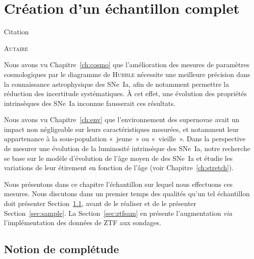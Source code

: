 \documentclass[../main/main.tex]{subfiles}
\begin{document}

\chapter{Cr\'eation d'un \'echantillon complet}\label{ch:sample}
\epigraph{\openquote Citation\closequote}{\textsc{Autaire}}

Nous avons vu Chapitre~\ref{ch:cosmo} que l'amélioration des mesures de
paramètres cosmologiques par le diagramme de \textsc{Hubble} nécessite une
meilleure précision dans la connaissance astrophysique des SNe~Ia, afin de
notamment permettre la réduction des incertitude systématiques. À cet effet, une
évolution des propriétés intrinsèques des SNe~Ia inconnue fausserait ces
résultats.

Nous avons vu Chapitre~\ref{ch:env} que l'environnement des supernovae avait un
impact non négligeable sur leurs caractéristiques mesurées, et notamment leur
appartenance à la sous-population «~jeune~» ou «~vieille~». Dans la perspective
de mesurer une évolution de la luminosité intrinsèque des SNe~Ia, notre
recherche se base sur le modèle d'évolution de l'âge moyen de \cite{rigault2020}
des SNe~Ia et étudie les variations de leur étirement en fonction de l'âge (voir
Chapitre~\ref{ch:stretch}).

Nous présentons dans ce chapitre l'échantillon sur lequel nous effectuons ces
mesures. Nous discutons dans un premier temps des qualités qu'un tel échantillon
doit présenter Section~\ref{sec:compl}, avant de le réaliser et de le présenter
Section~\ref{sec:sample}. La Section~\ref{sec:ztfsam} en présente l'augmentation
\textit{via} l'implémentation des données de ZTF aux sondages.

\vfill
\minitoc
\vfill
\newpage

\section{Notion de complétude}\label{sec:compl}

\end{document}
